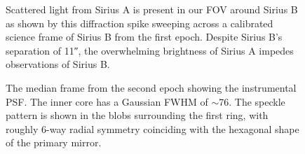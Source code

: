 \documentclass[twocolumn]{aastex631}
\newcommand\Lp{$\mathrm{L}^\prime$}
\begin{document}

\begin{figure}
    \centering
    \caption{Scattered light from Sirius A is present in our FOV around Sirius B as shown by this diffraction spike  sweeping across a calibrated science frame of Sirius B from the first epoch. Despite Sirius B's separation of \ang{;;11}, the overwhelming brightness of Sirius A impedes observations of Sirius B.}
    \label{fig:spike}
\end{figure}

\begin{figure}
    \centering
    \caption{The median frame from the second epoch showing the instrumental PSF. The inner core has a Gaussian FWHM of $\sim$\qty{76}{\milliarcsecond}. The speckle pattern is shown in the blobs surrounding the first ring, with roughly 6-way radial symmetry coinciding with the hexagonal shape of the primary mirror.}
    \label{fig:psf}
\end{figure}
\end{document}
